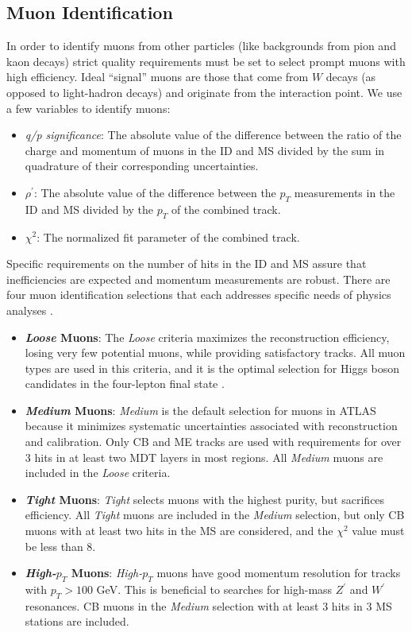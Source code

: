 \subsection{Muon Identification}
In order to identify muons from other particles (like backgrounds from pion and kaon decays) strict quality requirements must be set to select prompt muons with high efficiency. Ideal ``signal'' muons are those that come from $W$ decays (as opposed to light-hadron decays) and originate from the interaction point. We use a few variables to identify muons:
\begin{itemize}
\item \textit{q/p significance}: The absolute value of the difference between the ratio of the charge and momentum of muons in the ID and MS divided by the sum in quadrature of their corresponding uncertainties.
\item \textit{$\rho^\prime$}: The absolute value of the difference between the $p_T$ measurements in the ID and MS divided by the $p_T$ of the combined track. 
\item \textit{$\chi ^2$}: The normalized fit parameter of the combined track.
\end{itemize}

Specific requirements on the number of hits in the ID and MS assure that inefficiencies are expected and momentum measurements are robust. There are four muon identification selections that each addresses specific needs of physics analyses \cite{MCPpaper}.

\begin{itemize}
\item \textbf{\textit{Loose} Muons}: The \textit{Loose} criteria maximizes the reconstruction efficiency, losing very few potential muons, while providing satisfactory tracks. All muon types are used in this criteria, and it is the optimal selection for Higgs boson candidates in the four-lepton final state \cite{4l}.
\item \textbf{\textit{Medium} Muons}: \textit{Medium} is the default selection for muons in ATLAS because it minimizes systematic uncertainties associated with reconstruction and calibration. Only CB and ME tracks are used with requirements for over 3 hits in at least two MDT layers in most regions. All \textit{Medium} muons are included in the \textit{Loose} criteria.
\item \textbf{\textit{Tight} Muons}: \textit{Tight} selects muons with the highest purity, but sacrifices efficiency. All \textit{Tight} muons are included in the \textit{Medium} selection, but only CB muons with at least two hits in the MS are considered, and the $\chi^2$ value must be less than $8$.  
\item \textbf{\textit{High-$p_T$} Muons}: \textit{High-$p_T$} muons have good momentum resolution for tracks with $p_T > 100$ GeV. This is beneficial to searches for high-mass $Z^\prime$ and $W^\prime$ resonances. CB muons in the \textit{Medium} selection with at least $3$ hits in $3$ MS stations are included. 
\end{itemize}

